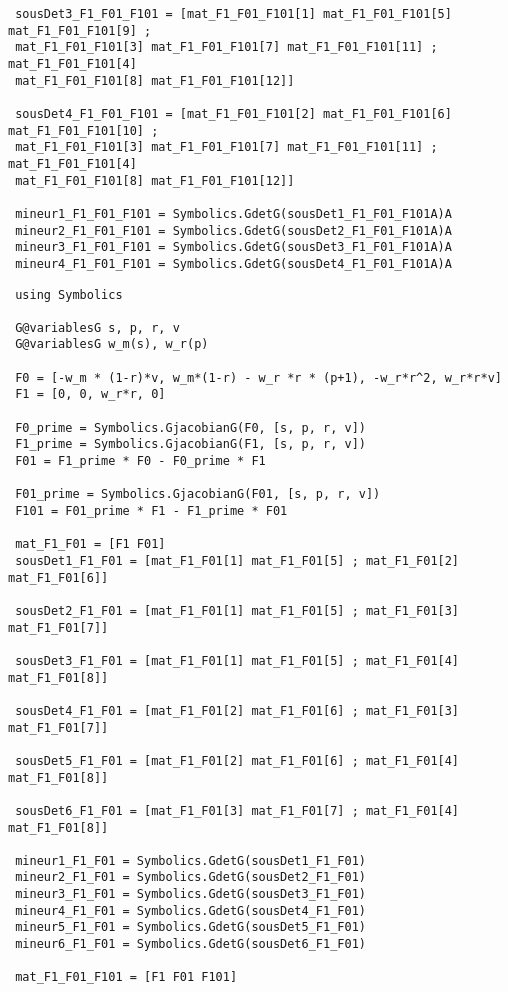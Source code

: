 \begin{lstlisting}
 sousDet3_F1_F01_F101 = [mat_F1_F01_F101[1] mat_F1_F01_F101[5] mat_F1_F01_F101[9] ;
 mat_F1_F01_F101[3] mat_F1_F01_F101[7] mat_F1_F01_F101[11] ; mat_F1_F01_F101[4]
 mat_F1_F01_F101[8] mat_F1_F01_F101[12]]

 sousDet4_F1_F01_F101 = [mat_F1_F01_F101[2] mat_F1_F01_F101[6] mat_F1_F01_F101[10] ;
 mat_F1_F01_F101[3] mat_F1_F01_F101[7] mat_F1_F01_F101[11] ; mat_F1_F01_F101[4]
 mat_F1_F01_F101[8] mat_F1_F01_F101[12]]
 
 mineur1_F1_F01_F101 = Symbolics.GdetG(sousDet1_F1_F01_F101A)A
 mineur2_F1_F01_F101 = Symbolics.GdetG(sousDet2_F1_F01_F101A)A
 mineur3_F1_F01_F101 = Symbolics.GdetG(sousDet3_F1_F01_F101A)A
 mineur4_F1_F01_F101 = Symbolics.GdetG(sousDet4_F1_F01_F101A)A
\end{lstlisting}
\begin{lstlisting}
 using Symbolics

 G@variablesG s, p, r, v
 G@variablesG w_m(s), w_r(p)

 F0 = [-w_m * (1-r)*v, w_m*(1-r) - w_r *r * (p+1), -w_r*r^2, w_r*r*v]
 F1 = [0, 0, w_r*r, 0]
 
 F0_prime = Symbolics.GjacobianG(F0, [s, p, r, v])
 F1_prime = Symbolics.GjacobianG(F1, [s, p, r, v])
 F01 = F1_prime * F0 - F0_prime * F1
 
 F01_prime = Symbolics.GjacobianG(F01, [s, p, r, v])
 F101 = F01_prime * F1 - F1_prime * F01
 
 mat_F1_F01 = [F1 F01]
 sousDet1_F1_F01 = [mat_F1_F01[1] mat_F1_F01[5] ; mat_F1_F01[2] mat_F1_F01[6]]

 sousDet2_F1_F01 = [mat_F1_F01[1] mat_F1_F01[5] ; mat_F1_F01[3] mat_F1_F01[7]]

 sousDet3_F1_F01 = [mat_F1_F01[1] mat_F1_F01[5] ; mat_F1_F01[4] mat_F1_F01[8]]

 sousDet4_F1_F01 = [mat_F1_F01[2] mat_F1_F01[6] ; mat_F1_F01[3] mat_F1_F01[7]]

 sousDet5_F1_F01 = [mat_F1_F01[2] mat_F1_F01[6] ; mat_F1_F01[4] mat_F1_F01[8]]

 sousDet6_F1_F01 = [mat_F1_F01[3] mat_F1_F01[7] ; mat_F1_F01[4] mat_F1_F01[8]]
 
 mineur1_F1_F01 = Symbolics.GdetG(sousDet1_F1_F01)
 mineur2_F1_F01 = Symbolics.GdetG(sousDet2_F1_F01)
 mineur3_F1_F01 = Symbolics.GdetG(sousDet3_F1_F01)
 mineur4_F1_F01 = Symbolics.GdetG(sousDet4_F1_F01)
 mineur5_F1_F01 = Symbolics.GdetG(sousDet5_F1_F01)
 mineur6_F1_F01 = Symbolics.GdetG(sousDet6_F1_F01)
 
 mat_F1_F01_F101 = [F1 F01 F101]
 

\end{lstlisting}
